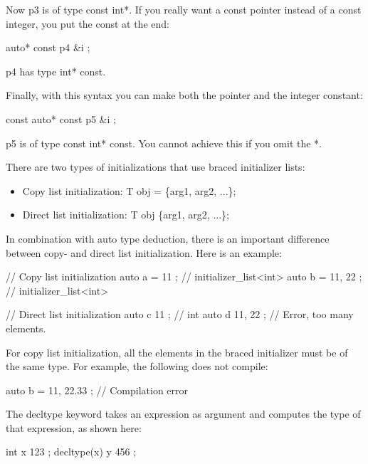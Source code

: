 Now p3 is of type const int*. If you really want a const pointer instead of a const integer, you put the const at the end:

\begin{cpp}
auto* const p4 { &i };
\end{cpp}

p4 has type int* const.

Finally, with this syntax you can make both the pointer and the integer constant:

\begin{cpp}
const auto* const p5 { &i };
\end{cpp}

p5 is of type const int* const. You cannot achieve this if you omit the *.


There are two types of initializations that use braced initializer lists:

\begin{itemize}
\item
Copy list initialization: T obj = \{arg1, arg2, ...\};

\item
Direct list initialization: T obj \{arg1, arg2, ...\};
\end{itemize}

In combination with auto type deduction, there is an important difference between copy- and direct list initialization. Here is an example:

\begin{cpp}
// Copy list initialization
auto a = { 11 }; // initializer_list<int>
auto b = { 11, 22 }; // initializer_list<int>

// Direct list initialization
auto c { 11 }; // int
auto d { 11, 22 }; // Error, too many elements.
\end{cpp}

For copy list initialization, all the elements in the braced initializer must be of the same type. For example, the following does not compile:

\begin{cpp}
auto b = { 11, 22.33 }; // Compilation error
\end{cpp}


The decltype keyword takes an expression as argument and computes the type of that expression, as shown here:

\begin{cpp}
int x { 123 };
decltype(x) y { 456 };
\end{cpp}

